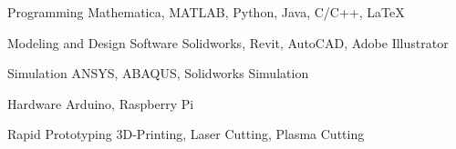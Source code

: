 

\begin{cvskills}

  \cvskill
    {Programming} %
    {Mathematica, MATLAB, Python, Java, C/C++, LaTeX} %

  \cvskill
    {Modeling and Design Software} %
    {Solidworks, Revit, AutoCAD, Adobe Illustrator} %

  \cvskill
    {Simulation} %
    {ANSYS, ABAQUS, Solidworks Simulation} %

  \cvskill
    {Hardware} %
    {Arduino, Raspberry Pi} %
    
  \cvskill
    {Rapid Prototyping} %
    {3D-Printing, Laser Cutting, Plasma Cutting} %

\end{cvskills}
